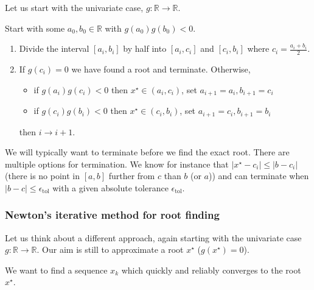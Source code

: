 Let us start with the univariate case, $g: \mathbb{R} \to \mathbb{R}$. 



Start with some $a_0,b_0 \in \mathbb{R}$ with $g(a_0)g(b_0)<0$.

\begin{enumerate}
    \item Divide the interval $[a_i,b_i]$ by half into $[a_i,c_i]$ and $[c_i,b_i]$ where $c_i = \frac{a_i+b_i}{2}$.
    \item If $g(c_i) = 0$ we have found a root and terminate. Otherwise,
    \begin{itemize}
        \item if $g(a_i)g(c_i)<0$ then $x^\star \in (a_i,c_i)$, set $a_{i+1} = a_{i}, b_{i+1} = c_i$
        \item if $g(c_i)g(b_i)<0$ then $x^\star \in (c_i,b_i)$, set $a_{i+1} = c_{i}, b_{i+1} = b_i$
    \end{itemize}
    then $i \to i + 1$.
\end{enumerate}

We will typically want to terminate before we find the exact root. There are multiple options for termination.
We know for instance that $|x^\star - c_i| \leq |b - c_i|$ (there is no point in $[a,b]$ further from $c$ than $b$ (or $a$))
and can terminate when $|b - c| \leq \epsilon_\text{tol}$ with a given absolute tolerance $\epsilon_\text{tol}$.



\subsubsection{Newton's iterative method for root finding}

Let us think about a different approach, again starting with the
univariate case $g: \mathbb{R} \to \mathbb{R}$. Our aim is still
to approximate a root $x^\star$ ($g(x^\star) = 0$).

We want to find a sequence $x_k$ which quickly
and reliably converges to the root $x^\star$.

